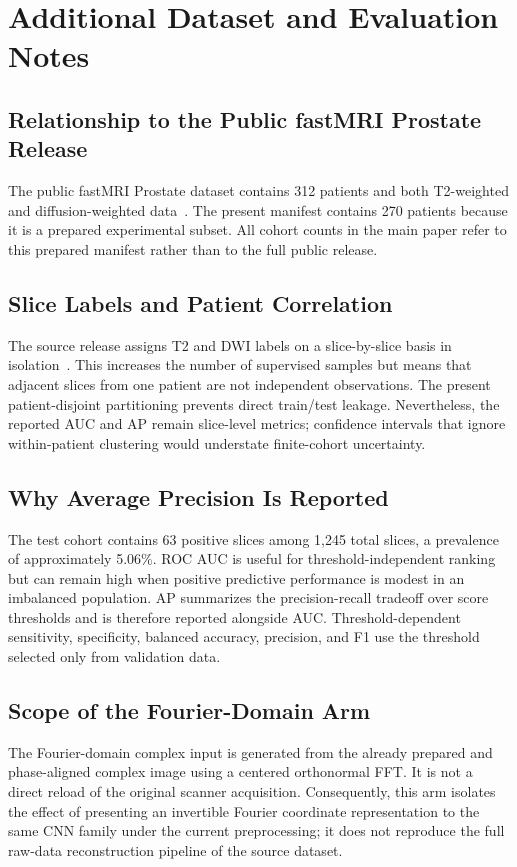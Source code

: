 \section{Additional Dataset and Evaluation Notes}\label{app:dataset}
\subsection{Relationship to the Public fastMRI Prostate Release}
The public fastMRI Prostate dataset contains 312 patients and both T2-weighted and diffusion-weighted data~\cite{Tibrewala2024FastMRIProstate}. The present manifest contains 270 patients because it is a prepared experimental subset. All cohort counts in the main paper refer to this prepared manifest rather than to the full public release.

\subsection{Slice Labels and Patient Correlation}
The source release assigns T2 and DWI labels on a slice-by-slice basis in isolation~\cite{Tibrewala2024FastMRIProstate}. This increases the number of supervised samples but means that adjacent slices from one patient are not independent observations. The present patient-disjoint partitioning prevents direct train/test leakage. Nevertheless, the reported AUC and AP remain slice-level metrics; confidence intervals that ignore within-patient clustering would understate finite-cohort uncertainty.

\subsection{Why Average Precision Is Reported}
The test cohort contains 63 positive slices among 1,245 total slices, a prevalence of approximately 5.06\%. ROC AUC is useful for threshold-independent ranking but can remain high when positive predictive performance is modest in an imbalanced population. AP summarizes the precision-recall tradeoff over score thresholds and is therefore reported alongside AUC. Threshold-dependent sensitivity, specificity, balanced accuracy, precision, and F1 use the threshold selected only from validation data.

\subsection{Scope of the Fourier-Domain Arm}
The Fourier-domain complex input is generated from the already prepared and phase-aligned complex image using a centered orthonormal FFT. It is not a direct reload of the original scanner acquisition. Consequently, this arm isolates the effect of presenting an invertible Fourier coordinate representation to the same CNN family under the current preprocessing; it does not reproduce the full raw-data reconstruction pipeline of the source dataset.
